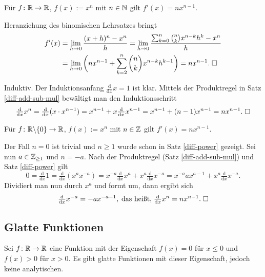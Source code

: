 \begin{Satz}\label{diff-power}
Für $f\colon\mathbb R\to\mathbb R$, $f(x):=x^n$ mit $n\in\mathbb N$ gilt
$f'(x)=nx^{n-1}$.
\end{Satz}
\begin{Beweis}[Beweis 1]
Heranziehung des binomischen Lehrsatzes bringt
\begin{align*}
f'(x) &= \lim_{h\to 0}\frac{(x+h)^n-x^n}{h}
= \lim_{h\to 0}\frac{\sum_{k=0}^n\binom{n}{k}x^{n-k} h^k-x^n}{h}\\
&= \lim_{h\to 0}\bigg(nx^{n-1}+\sum_{k=2}^n\binom{n}{k}x^{n-k}h^{k-1}\bigg)
= nx^{n-1}.\;\square
\end{align*}
\end{Beweis}
\begin{Beweis}[Beweis 2]
Induktiv. Der Induktionsanfang $\tfrac{\mathrm d}{\mathrm dx}x=1$ ist klar.
Mittels der Produktregel in Satz \ref{diff-add-sub-mul}
bewältigt man den Induktionsschritt 
\begin{align*}
\tfrac{\mathrm d}{\mathrm dx} x^n = \tfrac{\mathrm d}{\mathrm dx} (x\cdot x^{n-1})
= x^{n-1}+x\tfrac{\mathrm d}{\mathrm dx}x^{n-1}
= x^{n-1}+(n-1)x^{n-1} = nx^{n-1}.\;\square
\end{align*}
\end{Beweis}

\begin{Satz}
Für $f\colon\mathbb R{\setminus}\{0\}\to\mathbb R$, $f(x):=x^n$ mit $n\in\mathbb Z$
gilt $f'(x)=nx^{n-1}$.
\end{Satz}
\begin{Beweis}
Der Fall $n=0$ ist trivial und $n\ge 1$ wurde schon in Satz
\ref{diff-power} gezeigt. Sei nun $a\in\mathbb Z_{\ge 1}$ und $n=-a$. Nach der
Produktregel (Satz \ref{diff-add-sub-mul}) und Satz
\ref{diff-power} gilt
\[0 = \tfrac{\mathrm d}{\mathrm dx} 1
= \tfrac{\mathrm d}{\mathrm dx} (x^a x^{-a})
= x^{-a}\tfrac{\mathrm d}{\mathrm dx} x^a+x^a\tfrac{\mathrm d}{\mathrm dx} x^{-a}
= x^{-a}ax^{a-1}+x^a\tfrac{\mathrm d}{\mathrm dx} x^{-a}.\]
Dividiert man nun durch $x^a$ und formt um, dann ergibt sich
\[\tfrac{\mathrm d}{\mathrm dx} x^{-a} = -ax^{-a-1},
\;\text{das heißt,}\;
\tfrac{\mathrm d}{\mathrm dx} x^n = nx^{n-1}.\;\square\]
\end{Beweis}

\newpage
\subsection{Glatte Funktionen}

\begin{Satz}
Sei $f\colon\mathbb R\to\mathbb R$ eine Funktion mit der Eigenschaft
$f(x)=0$ für $x\le 0$ und $f(x)>0$ für $x>0$. Es gibt glatte Funktionen
mit dieser Eigenschaft, jedoch keine analytischen.
\end{Satz}

